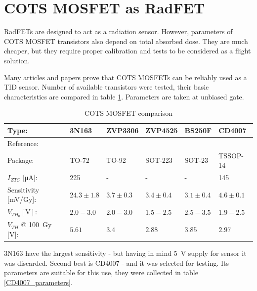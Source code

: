\section{COTS MOSFET as RadFET}
    RadFETs are designed to act as a radiation sensor. However, parameters of COTS MOSFET transistors also depend on total absorbed dose. They are much cheaper, but they require proper calibration and tests to be considered as a flight solution. 
    
    Many articles and papers prove that COTS MOSFETs can be reliably used as a TID sensor. Number of available transistors were tested, their basic characteristics are compared in table \ref{cots_mosfet_comparison}. Parameters are taken at unbiased gate.
    
    \begin{table}[H]
    \begin{tabular}{| L{2cm} | C{2.4cm} | C{2.4cm} | C{2.4cm} | C{2.4cm} | C{2.4cm} |}
        \hline
        Type: & 3N163 & ZVP3306 & ZVP4525 & BS250F & CD4007 \\ \hline
        Reference: & \cite{3N163_article} & \cite{COTSMosfetsGarcia} & \cite{COTSMosfetsGarcia} & \cite{COTSMosfetsGarcia} & \cite{COTSMosfetsGarcia} \\ \hline
        
        Package: & TO-72 & TO-92 & SOT-223 & SOT-23 & TSSOP-14 \\ \hline
        
        $I_{ZTC}$ [\si{\micro\ampere}]: & 225 & - & - & - & 145 \\ \hline

        Sensitivity [\si{\milli\volt/\gray}]: & $24.3\pm 1.8$ & $3.7\pm 0.3$ & $3.4\pm 0.4$ & $3.1\pm 0.4$ & $4.6\pm 0.1$ \\ \hline
        
        $V_{TH_0} [\si{\volt}]$: & $2.0 - 3.0$ & $2.0 - 3.0$ & $1.5 - 2.5$ & $2.5 - 3.5$ & $1.9 - 2.5$ \\ \hline

        $V_{TH}$ @ \SI{100}{\gray} [\si{\volt}]: & $5.61$ & $3.4$ & $2.88$ & $3.85$ & $2.97$ \\ \hline
    \end{tabular}
    \caption{COTS MOSFET comparison}
    \label{cots_mosfet_comparison}
    \end{table}

    3N163 have the largest sensitivity - but having in mind \SI{5}{\volt} supply for sensor it was discarded. Second best is CD4007 - and it was selected for testing. Its parameters are suitable for this use, they were collected in table \ref{CD4007_parameters}.
    
